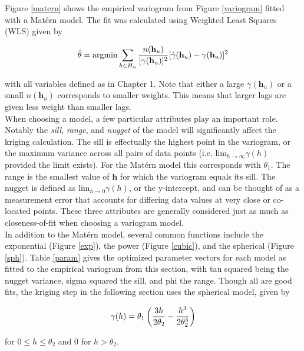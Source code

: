 \documentclass[12pt,twoside]{reedthesis}
\begin{document}
Figure \ref{matern} shows the empirical variogram from Figure \ref{variogram} fitted with a Mat\'ern model. The fit was calculated using Weighted Least Squares (WLS) given by

\begin{align*}
\hat{\mathbf{\theta}} = \text{argmin}\sum_{h \in H_u} {{n(\mathbf{h}_u)}\over{[\gamma(\mathbf{h}_u)]^2}}[\hat\gamma(\mathbf{h}_u) - \gamma(\mathbf{h}_u)]^2
\end{align*}

with all variables defined as in Chapter 1. Note that either a large $\gamma(\mathbf{h}_u)$ or a small $n(\mathbf{h}_u)$ corresponds to smaller weights. This means that larger lags are given less weight than smaller lags. \\

When choosing a model, a few particular attributes play an important role. Notably the \emph{sill}, \emph{range}, and \emph{nugget} of the model will significantly affect the kriging calculation. The sill is effectually the highest point in the variogram, or the maximum variance across all pairs of data points (i.e. $\text{lim}_{h\to\infty}\gamma(h)$ provided the limit exists). For the Mat\'ern model this corresponds with $\theta_1$. The range is the smallest value of $\mathbf{h}$ for which the variogram equals its sill. The nugget is defined as $\text{lim}_{h\to0}\gamma(h)$, or the y-intercept,  and can be thought of as a measurement error that accounts for differing data values at very close or co-located points. These three attributes are generally considered just as much as closeness-of-fit when choosing a variogram model. \\

In addition to the Mat\'ern model, several common functions include the exponential (Figure \ref{exp}), the power (Figure \ref{cubic}), and the spherical (Figure \ref{sph}). Table \ref{param} gives the optimized parameter vectors for each model as fitted to the empirical variogram from this section, with tau squared being the nugget variance, sigma squared the sill, and phi the range. Though all are good fits, the kriging step in the following section uses the spherical model, given by

\begin{align*}
\gamma(h) = \theta_1 \left ( {{3h}\over{2\theta_2}} - {{h^3}\over{2\theta_2^3}} \right )
\end{align*}

for $0 \leq h \leq \theta_2$ and 0 for $h > \theta_2$.
\end{document}

